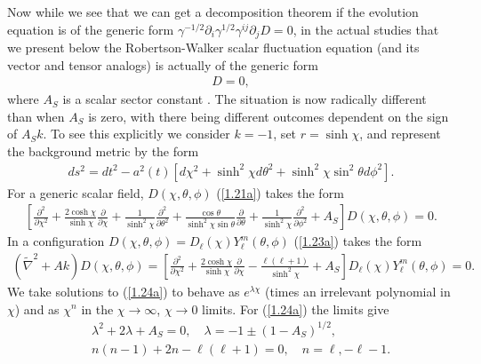 \documentclass[aps,onecolumn,10pt]{revtex4}
\numberwithin{equation}{section}
\numberwithin{equation}{section}
\begin{document}
Now while we see that we can get a decomposition theorem if the evolution equation is of the generic form $\gamma^{-1/2}\partial_i\gamma^{1/2}\gamma^{ij}\partial_jD=0$, in the actual studies that we present below the Robertson-Walker scalar fluctuation equation (and its vector and tensor analogs) is actually of the generic form   
%
\begin{align}
[\gamma^{-1/2}\partial_i\gamma^{1/2}\gamma^{ij}\partial_j-A_Sk]D=0,
\label{1.21a}
\end{align}
%
where $A_S$ is a scalar sector constant \cite{footnote1}. The situation is now radically different than when $A_S$ is zero, with there being different outcomes dependent on the sign of $A_Sk$. To see this explicitly we consider $k=-1$, set $r=\sinh\chi$, and represent the background metric by the form
%
\begin{eqnarray}
ds^2= dt^2-a^2(t)[d\chi^2+\sinh^2\chi d\theta^2+\sinh^2\chi\sin^2\theta d\phi^2].
\label{1.22a}
\end{eqnarray}
%
For a generic scalar field, $D(\chi,\theta,\phi)$  (\ref{1.21a}) takes the form 
%
\begin{eqnarray}
\left[ \frac{\partial^2}{\partial\chi^2}+\frac{2\cosh\chi}{\sinh\chi}\frac{\partial}{\partial\chi}+\frac{1}{\sinh^2\chi}\frac{\partial^2}{\partial\theta^2}+\frac{\cos\theta}{\sinh^2\chi\sin\theta}\frac{\partial}{\partial\theta}+\frac{1}{\sinh^2\chi}\frac{\partial^2}{\partial\phi^2}+A_S\right]D(\chi,\theta,\phi)=0.
\label{1.23a}
\end{eqnarray}
%
In a configuration $D(\chi,\theta,\phi)=D_{\ell}(\chi)Y_{\ell}^m(\theta,\phi)$ (\ref{1.23a}) takes the form 
%
\begin{eqnarray}
(\tilde{\nabla}^2+Ak)D(\chi,\theta,\phi)=\left[ \frac{\partial^2}{\partial\chi^2}+\frac{2\cosh\chi}{\sinh\chi}\frac{\partial}{\partial\chi}-\frac{\ell(\ell+1)}{\sinh^2\chi}+A_S\right]D_{\ell}(\chi)Y_{\ell}^m(\theta,\phi)=0.
\label{1.24a}
\end{eqnarray}
%
We take solutions to (\ref{1.24a}) to behave as $e^{\lambda\chi}$ (times an irrelevant polynomial in $\chi$) and as $\chi^n$ in the $\chi\rightarrow \infty$, $\chi\rightarrow 0$ limits. For (\ref{1.24a}) the limits give
%
\begin{eqnarray}
&&\lambda^2+2\lambda+A_S=0,\quad \lambda=-1\pm(1-A_S)^{1/2},
\nonumber\\
&&n(n-1)+2n-\ell(\ell+1)=0,\quad n=\ell, -\ell-1.
\label{1.25a}
\end{eqnarray}
%
\end{document}

